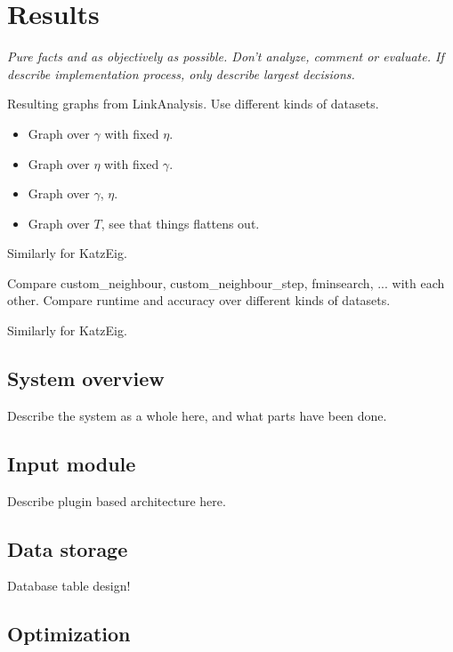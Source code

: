 \chapter{Results}\label{cha:Results}

\textit{Pure facts and as objectively as possible. Don't analyze, comment or evaluate.  If describe implementation process, only describe largest decisions.}

Resulting graphs from LinkAnalysis. Use different kinds of datasets.

\begin{itemize}
    \item Graph over $\gamma$ with fixed $\eta$.
    \item Graph over $\eta$ with fixed $\gamma$.
    \item Graph over $\gamma$, $\eta$.
    \item Graph over $T$, see that things flattens out.
\end{itemize}

Similarly for KatzEig.


Compare custom\_neighbour, custom\_neighbour\_step, fminsearch, ... with each other. Compare runtime and accuracy over different kinds of datasets.

Similarly for KatzEig.


\section{System overview}\label{sec:res:sys}

Describe the system as a whole here, and what parts have been done.


\section{Input module}\label{sec:res:input}

Describe plugin based architecture here.


\section{Data storage}\label{sec:res:data}

Database table design!


\section{Optimization}\label{sec:res:opt}

